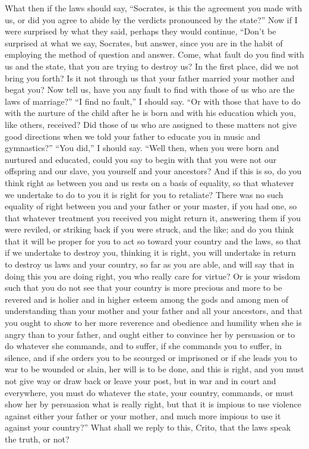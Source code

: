 \documentclass[letterpaper,12pt]{article}
\begin{document}
\begin{drama}
What then if the laws should say, ``Socrates, is this the agreement you made with us, or did you agree to abide by the verdicts pronounced by the state?'' Now if I were surprised by what they said, perhaps they would continue, ``Don't be surprised at what we say, Socrates, but answer, since you are in the habit of employing the method of question and answer. Come,  what fault do you find with us and the state, that you are trying to destroy us? In the first place, did we not bring you forth? Is it not through us that your father married your mother and begat you? Now tell us, have you any fault to find with those of us who are the laws of marriage?'' ``I find no fault,'' I should say. ``Or with those that have to do with the nurture of the child after he is born and with his education which you, like others, received? Did those of us who are assigned to these matters not give good directions when we told your father to educate you in music and gymnastics?''  ``You did,'' I should say. ``Well then, when you were born and nurtured and educated, could you say to begin with that you were not our offspring and our slave, you yourself and your ancestors? And if this is so, do you think right as between you and us rests on a basis of equality, so that whatever we undertake to do to you it is right for you to retaliate? There was no such equality of right between you and your father or your master, if you had one, so that whatever treatment you received you might return it, answering them if you were reviled,  or striking back if you were struck, and the like; and do you think that it will be proper for you to act so toward your country and the laws, so that if we undertake to destroy you, thinking it is right, you will undertake in return to destroy us laws and your country, so far as you are able, and will say that in doing this you are doing right, you who really care for virtue? Or is your wisdom such that you do not see that your country is more precious and more to be revered and is holier and in higher esteem  among the gods and among men of understanding than your mother and your father and all your ancestors, and that you ought to show to her more reverence and obedience and humility when she is angry than to your father, and ought either to convince her by persuasion or to do whatever she commands, and to suffer, if she commands you to suffer, in silence, and if she orders you to be scourged or imprisoned or if she leads you to war to be wounded or slain, her will is to be done, and this is right, and you must not give way or draw back or leave your post, but in war and in court and everywhere,  you must do whatever the state, your country, commands, or must show her by persuasion what is really right, but that it is impious to use violence against either your father or your mother, and much more impious to use it against your country?'' What shall we reply to this, Crito, that the laws speak the truth, or not?

\end{drama}
\end{document}
